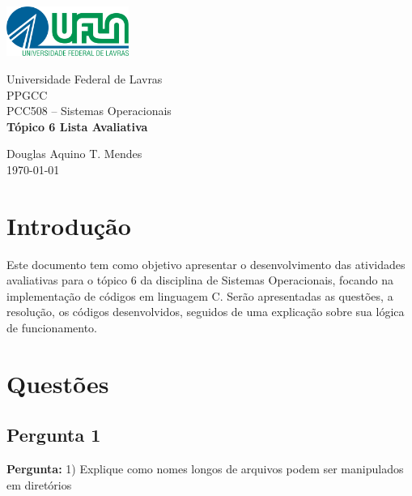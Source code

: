 \documentclass{article}
\begin{document}
\begin{titlepage}
    \centering
    \includegraphics[width=0.3\textwidth]{../../Topic1/Avaliativo/Imagens/Logo UFLA - Colorida chapada.png}

    \vspace*{2cm} %
    \Large
    Universidade Federal de Lavras\\
    PPGCC\\
    PCC508 – Sistemas Operacionais\\
    
    \vspace{2cm} %
    \huge %
    \textbf{Tópico 6 Lista Avaliativa}
    
    \vfill %
    
    \large
    Douglas Aquino T. Mendes\\
    \today %
\end{titlepage}

\tableofcontents
\newpage

\section{Introdução}
Este documento tem como objetivo apresentar o desenvolvimento das atividades avaliativas para o tópico 6 da disciplina de Sistemas Operacionais, focando na implementação de códigos em linguagem C. Serão apresentadas as questões, a resolução, os códigos desenvolvidos, seguidos de uma explicação sobre sua lógica de funcionamento.

\section{Questões}

\subsection{Pergunta 1}
\textbf{Pergunta:} 1) Explique como nomes longos de arquivos podem ser manipulados em diretórios\newline
\end{document}
